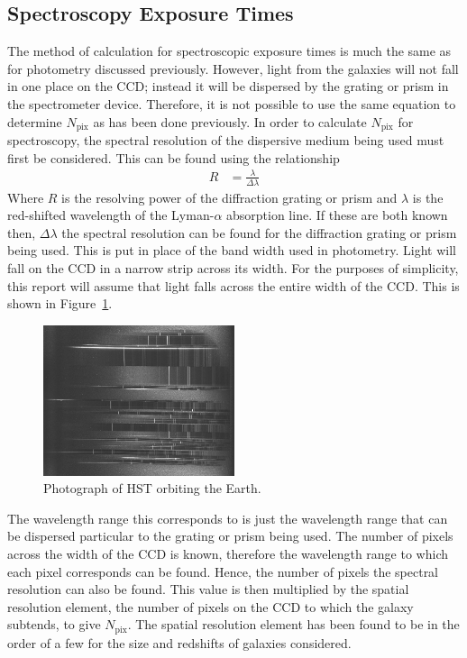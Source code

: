 \subsection{Spectroscopy Exposure Times} %
\label{sub:calculation_of_exposure_times}
	The method of calculation for spectroscopic exposure times is much the same as for photometry discussed previously. However, light from the galaxies will not fall in one place on the CCD; instead it will be dispersed by the grating or prism in the spectrometer device. Therefore, it is not possible to use the same equation to determine $N_\text{pix}$ as has been done previously. In order to calculate $N_\text{pix}$ for spectroscopy, the spectral resolution of the dispersive medium being used must first be considered. This can be found using the relationship
	\begin{align}
		R &= \frac{\lambda}{\Delta\lambda}
	\end{align}
	Where $R$ is the resolving power of the diffraction grating or prism and $\lambda$ is the red-shifted wavelength of the Lyman-$\alpha$ absorption line. If these are both known then, $\Delta\lambda$ the spectral resolution can be found for the diffraction grating or prism being used. This is put in place of the band width used in photometry. Light will fall on the CCD in a narrow strip across its width. For the purposes of simplicity, this report will assume that light falls across the entire width of the CCD. This is shown in Figure~\ref{fig:multi_object_spectrum}.
	\begin{figure}[htbp]
		\centering
		\includegraphics[width=0.5\textwidth]{../Images/Multi_Object_spectrum_picture.png}
		\caption{Photograph of HST orbiting the Earth.\label{fig:multi_object_spectrum}}
	\end{figure}

	The wavelength range this corresponds to is just the wavelength range that can be dispersed particular to the grating or prism being used. The number of pixels across the width of the CCD is known, therefore the wavelength range to which each pixel corresponds can be found. Hence, the number of pixels the spectral resolution can also be found. This value is then multiplied by the spatial resolution element, the number of pixels on the CCD to which the galaxy subtends, to give $N_\text{pix}$. The spatial resolution element has been found to be in the order of a few for the size and redshifts of galaxies considered\cite{SpatialRes}.

